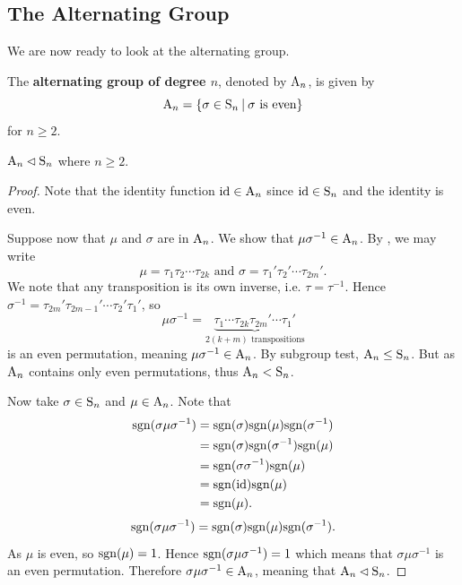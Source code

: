 \subsection{The Alternating Group}
We are now ready to look at the alternating group.
\begin{definition}
    The \textbf{alternating group of degree $n$}, denoted by $\mathrm{A}_{n}$, is given by
    \[
        \An{n} = \left\{\sigma \in \Sn{n} \vert \sigma \text{ is even}\right\}
    \]
    for $n \geq 2$.
\end{definition}

\begin{proposition}\label{prop-An-normal-subgroup-of-Sn}
    $\mathrm{A}_{n} \lhd \mathrm{S}_{n}$ where $n \geq 2$.
\end{proposition}
\begin{proof}
    Note that the identity function $\mathrm{id} \in \mathrm{A}_{n}$ since $\mathrm{id} \in \mathrm{S}_{n}$ and the identity is even.

    Suppose now that $\mu$ and $\sigma$ are in $\mathrm{A}_{n}$. We show that $\mu\sigma^{-1} \in \mathrm{A}_{n}$. By , we may write
    \[
        \mu = \tau_1\tau_2\cdots\tau_{2k} \text{ and } \sigma = \tau_1'\tau_2'\cdots\tau_{2m}'.
    \]
    We note that any transposition is its own inverse, i.e. $\tau = \tau^{-1}$. Hence $\sigma^{-1} = \tau_{2m}'\tau_{2m-1}'\cdots\tau_2'\tau_1'$, so
    \[
        \mu\sigma^{-1} = \underbrace{\tau_1\cdots\tau_{2k}\tau_{2m}'\cdots\tau_1'}_{2(k+m) \text{ transpositions}}
    \]
    is an even permutation, meaning $\mu\sigma^{-1} \in \mathrm{A}_{n}$. By subgroup test, $\mathrm{A}_{n} \leq \mathrm{S}_{n}$. But as $\mathrm{A}_{n}$ contains only even permutations, thus $\mathrm{A}_{n} < \mathrm{S}_{n}$.
    
    Now take $\sigma \in \mathrm{S}_{n}$ and $\mu \in \mathrm{A}_{n}$. Note that
    \begin{align*}
        \mathrm{sgn}(\sigma\mu\sigma^{-1}) &= \mathrm{sgn}(\sigma)\mathrm{sgn}(\mu)\mathrm{sgn}(\sigma^{-1})\\
        &= \mathrm{sgn}(\sigma)\mathrm{sgn}(\sigma^{-1})\mathrm{sgn}(\mu)\\
        &= \mathrm{sgn}(\sigma\sigma^{-1})\mathrm{sgn}(\mu)\\
        &= \mathrm{sgn}(\mathrm{id})\mathrm{sgn}(\mu)\\
        &= \mathrm{sgn}(\mu).
    \end{align*}
    \[
        \mathrm{sgn}(\sigma\mu\sigma^{-1}) = \mathrm{sgn}(\sigma)\mathrm{sgn}(\mu)\mathrm{sgn}(\sigma^{-1}).
    \]
    As $\mu$ is even, so $\mathrm{sgn}(\mu) = 1$. Hence $\mathrm{sgn}(\sigma\mu\sigma^{-1}) = 1$ which means that $\sigma\mu\sigma^{-1}$ is an even permutation. Therefore $\sigma\mu\sigma^{-1} \in \mathrm{A}_{n}$, meaning that $\mathrm{A}_{n} \lhd \mathrm{S}_{n}$.
\end{proof}

